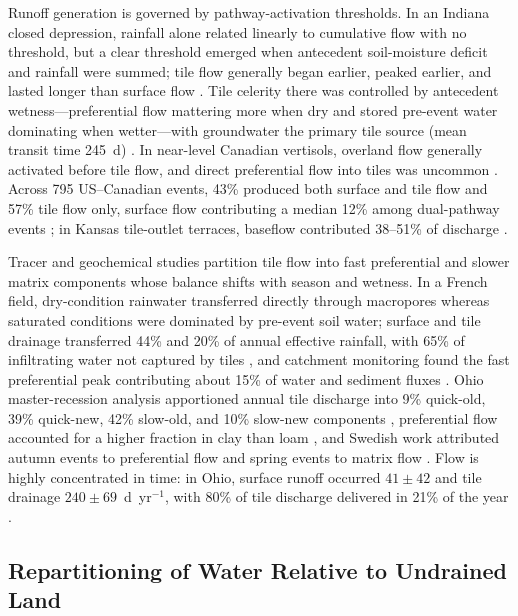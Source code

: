 \documentclass[11pt]{article}
\begin{document}
Runoff generation is governed by pathway-activation thresholds. In an Indiana closed depression, rainfall alone related linearly to cumulative flow with no threshold, but a clear threshold emerged when antecedent soil-moisture deficit and rainfall were summed; tile flow generally began earlier, peaked earlier, and lasted longer than surface flow \parencite{Williams2019}. Tile celerity there was controlled by antecedent wetness---preferential flow mattering more when dry and stored pre-event water dominating when wetter---with groundwater the primary tile source (mean transit time 245~d) \parencite{Williams2021}. In near-level Canadian vertisols, overland flow generally activated before tile flow, and direct preferential flow into tiles was uncommon \parencite{Kokulan2019}. Across 795 US--Canadian events, 43\% produced both surface and tile flow and 57\% tile flow only, surface flow contributing a median 12\% among dual-pathway events \parencite{Macrae2019}; in Kansas tile-outlet terraces, baseflow contributed 38--51\% of discharge \parencite{Stops2022}.

Tracer and geochemical studies partition tile flow into fast preferential and slower matrix components whose balance shifts with season and wetness. In a French field, dry-condition rainwater transferred directly through macropores whereas saturated conditions were dominated by pre-event soil water; surface and tile drainage transferred 44\% and 20\% of annual effective rainfall, with 65\% of infiltrating water not captured by tiles \parencite{Gaillot2023}, and catchment monitoring found the fast preferential peak contributing about 15\% of water and sediment fluxes \parencite{Grangeon2021}. Ohio master-recession analysis apportioned annual tile discharge into 9\% quick-old, 39\% quick-new, 42\% slow-old, and 10\% slow-new components \parencite{Nazari2021}, preferential flow accounted for a higher fraction in clay than loam \parencite{Pluer2020}, and Swedish work attributed autumn events to preferential flow and spring events to matrix flow \parencite{Salazar2011}. Flow is highly concentrated in time: in Ohio, surface runoff occurred $41\pm42$ and tile drainage $240\pm69$~d~yr$^{-1}$, with 80\% of tile discharge delivered in 21\% of the year \parencite{Williams2018}.

\subsection{Repartitioning of Water Relative to Undrained Land}
\end{document}
